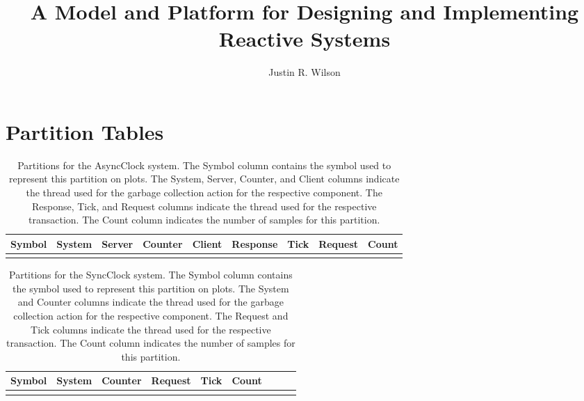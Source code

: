 \documentclass[letterpaper]{book}
\title{A Model and Platform for Designing and Implementing Reactive Systems}
\author{Justin R. Wilson}
\date{}
\begin{document}
\maketitle














{}

\appendix

\chapter{Partition Tables}

\begin{longtable}{ccccccccr}
Symbol & System & Server & Counter & Client & Response & Tick & Request & Count \\
\hline
\endhead

\caption{Partitions for the AsyncClock system.  The Symbol column contains the symbol used to represent this partition on plots.  The System, Server, Counter, and Client columns indicate the thread used for the garbage collection action for the respective component.  The Response, Tick, and Request columns indicate the thread used for the respective transaction.  The Count column indicates the number of samples for this partition.}
\label{async_partitions}
\end{longtable}

\begin{longtable}{ccccccccr}
Symbol & System & Counter & Request & Tick & Count \\
\hline
\endhead

\caption{Partitions for the SyncClock system.  The Symbol column contains the symbol used to represent this partition on plots.  The System and Counter columns indicate the thread used for the garbage collection action for the respective component.  The Request and Tick columns indicate the thread used for the respective transaction.  The Count column indicates the number of samples for this partition.}
\label{sync_partitions}
\end{longtable}
\end{document}

